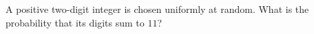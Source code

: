 A positive two-digit integer is chosen uniformly at random. What is the probability that its digits sum to $11$?
